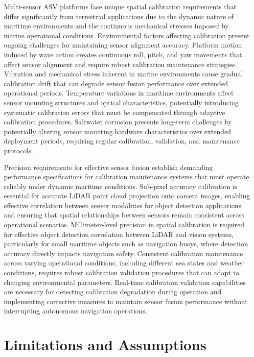 \documentclass{erauthesis}
\begin{document}
Multi-sensor \ac{ASV} platforms face unique spatial calibration requirements that differ significantly from terrestrial applications due to the dynamic nature of maritime environments and the continuous mechanical stresses imposed by marine operational conditions.
Environmental factors affecting calibration present ongoing challenges for maintaining sensor alignment accuracy. Platform motion induced by wave action creates continuous roll, pitch, and yaw movements that affect sensor alignment and require robust calibration maintenance strategies. Vibration and mechanical stress inherent in marine environments cause gradual calibration drift that can degrade sensor fusion performance over extended operational periods. Temperature variations in maritime environments affect sensor mounting structures and optical characteristics, potentially introducing systematic calibration errors that must be compensated through adaptive calibration procedures. Saltwater corrosion presents long-term challenges by potentially altering sensor mounting hardware characteristics over extended deployment periods, requiring regular calibration, validation, and maintenance protocols.

Precision requirements for effective sensor fusion establish demanding performance specifications for calibration maintenance systems that must operate reliably under dynamic maritime conditions. Sub-pixel accuracy calibration is essential for accurate \ac{LiDAR} point cloud projection onto camera images, enabling effective correlation between sensor modalities for object detection applications and ensuring that spatial relationships between sensors remain consistent across operational scenarios. Millimeter-level precision in spatial calibration is required for effective object detection correlation between \ac{LiDAR} and vision systems, particularly for small maritime objects such as navigation buoys, where detection accuracy directly impacts navigation safety. Consistent calibration maintenance across varying operational conditions, including different sea states and weather conditions, requires robust calibration validation procedures that can adapt to changing environmental parameters. Real-time calibration validation capabilities are necessary for detecting calibration degradation during operation and implementing corrective measures to maintain sensor fusion performance without interrupting autonomous navigation operations.

\section{Limitations and Assumptions} \label{limitations}
\end{document}
